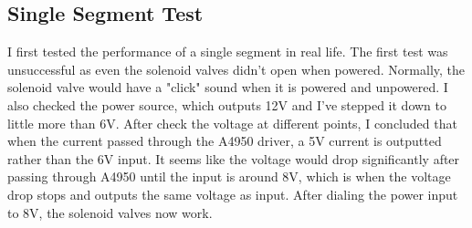 \documentclass[twoside, 11pt]{article}
\begin{document}
\subsection{Single Segment Test}
I first tested the performance of a single segment in real life. The first test was unsuccessful as even the solenoid valves didn't open when powered. Normally, the solenoid valve would have a "click" sound when it is powered and unpowered. I also checked the power source, which outputs 12V and I've stepped it down to little more than 6V. After check the voltage at different points, I concluded that when the current passed through the A4950 driver, a 5V current is outputted rather than the 6V input. It seems like the voltage would drop significantly after passing through A4950 until the input is around 8V, which is when the voltage drop stops and outputs the same voltage as input. After dialing the power input to 8V, the solenoid valves now work.
\end{document}
